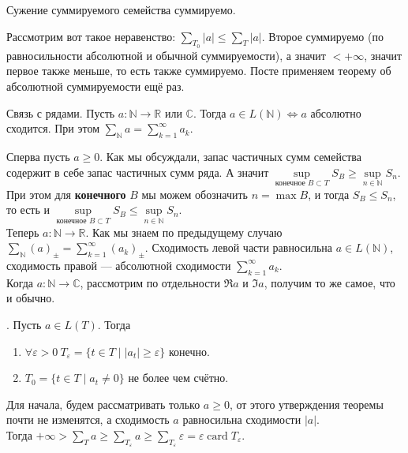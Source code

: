 \documentclass{article}
\begin{document}
\begin{itemize}
\begin{Proof}
        \end{Proof}
        \thm Сужение суммируемого семейства суммируемо.
        \begin{Proof}
            Рассмотрим вот такое неравенство: $\sum\limits_{T_0}|a|\leqslant\sum\limits_T|a|$. Второе суммируемо (по равносильности абсолютной и обычной суммируемости), а значит $<+\infty$, значит первое также меньше, то есть также суммируемо. Посте применяем теорему об абсолютной суммируемости ещё раз.
        \end{Proof}
        \thm Связь с рядами. Пусть $a\colon\mathbb N\to\mathbb R$ или $\mathbb C$. Тогда $a\in L(\mathbb N)\Leftrightarrow a$ абсолютно сходится. При этом $\sum\limits_{\mathbb N}a=\sum\limits_{k=1}^\infty a_k$.
        \begin{Proof}
            Сперва пусть $a\geqslant0$. Как мы обсуждали, запас частичных сумм семейства содержит в себе запас частичных сумм ряда. А значит $\sup\limits_{\text{конечное }B\subset T}S_B\geqslant\sup\limits_{n\in\mathbb N}S_n$. При этом для \textbf{конечного} $B$ мы можем обозначить $n=\max B$, и тогда $S_B\leqslant S_n$, то есть и $\sup\limits_{\text{конечное }B\subset T}S_B\leqslant\sup\limits_{n\in\mathbb N}S_n$.\\
            Теперь $a\colon\mathbb N\to\mathbb R$. Как мы знаем по предыдущему случаю $\sum\limits_{\mathbb N}(a)_\pm=\sum\limits_{k=1}^\infty(a_k)_\pm$. Сходимость левой части равносильна $a\in L(\mathbb N)$, сходимость правой --- абсолютной сходимости $\sum\limits_{k=1}^\infty a_k$.\\
            Когда $a\colon\mathbb N\to\mathbb C$, рассмотрим по отдельности $\Re a$ и $\Im a$, получим то же самое, что и обычно.
        \end{Proof}
        \thm {}. Пусть $a\in L(T)$. Тогда
        \begin{enumerate}
            \item $\forall\varepsilon>0~T_\varepsilon=\{t\in T\mid|a_t|\geqslant\varepsilon\}$ конечно.
            \item $T_0=\{t\in T\mid a_t\neq0\}$ не более чем счётно.
        \end{enumerate}
        \begin{Proof}
            Для начала, будем рассматривать только $a\geqslant0$, от этого утверждения теоремы почти не изменятся, а сходимость $a$ равносильна сходимости $|a|$.\\
            Тогда $+\infty>\sum\limits_Ta\geqslant\sum\limits_{T_\varepsilon}a\geqslant\sum\limits_{T_\varepsilon}\varepsilon=\varepsilon\operatorname{card}T_\varepsilon$.\\

\end{Proof}
\end{itemize}
\end{document}

